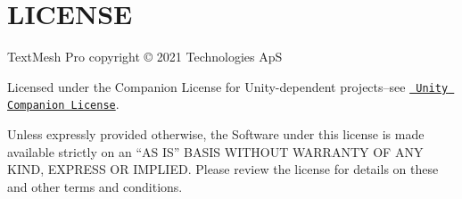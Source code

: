 \chapter{LICENSE}
\hypertarget{md__hey_tea_9_2_library_2_package_cache_2com_8unity_8textmeshpro_0d3_80_86_2_l_i_c_e_n_s_e}{}\label{md__hey_tea_9_2_library_2_package_cache_2com_8unity_8textmeshpro_0d3_80_86_2_l_i_c_e_n_s_e}
Text\+Mesh Pro copyright © 2021  Technologies ApS

Licensed under the  Companion License for Unity-\/dependent projects--see \href{http://www.unity3d.com/legal/licenses/Unity_Companion_License}{\texttt{ Unity Companion License}}.

Unless expressly provided otherwise, the Software under this license is made available strictly on an “\+AS IS” BASIS WITHOUT WARRANTY OF ANY KIND, EXPRESS OR IMPLIED. Please review the license for details on these and other terms and conditions. 